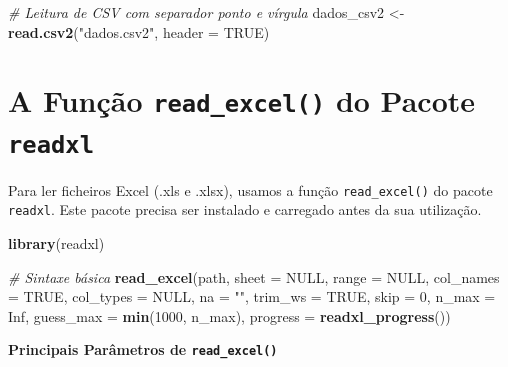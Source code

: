 \documentclass[
]{book}
\newenvironment{Shaded}{\begin{snugshade}}{\end{snugshade}}
\newcommand{\AttributeTok}[1]{\textcolor[rgb]{0.13,0.29,0.53}{#1}}
\newcommand{\CommentTok}[1]{\textcolor[rgb]{0.56,0.35,0.01}{\textit{#1}}}
\newcommand{\ConstantTok}[1]{\textcolor[rgb]{0.56,0.35,0.01}{#1}}
\newcommand{\DecValTok}[1]{\textcolor[rgb]{0.00,0.00,0.81}{#1}}
\newcommand{\FunctionTok}[1]{\textcolor[rgb]{0.13,0.29,0.53}{\textbf{#1}}}
\newcommand{\NormalTok}[1]{#1}
\newcommand{\OtherTok}[1]{\textcolor[rgb]{0.56,0.35,0.01}{#1}}
\newcommand{\StringTok}[1]{\textcolor[rgb]{0.31,0.60,0.02}{#1}}
\begin{document}
\begin{Shaded}
\begin{Highlighting}[]
\CommentTok{\# Leitura de CSV com separador ponto e vírgula}
\NormalTok{dados\_csv2 }\OtherTok{\textless{}{-}} \FunctionTok{read.csv2}\NormalTok{(}\StringTok{"dados.csv2"}\NormalTok{, }\AttributeTok{header =} \ConstantTok{TRUE}\NormalTok{)}
\end{Highlighting}
\end{Shaded}

\section{\texorpdfstring{A Função \texttt{read\_excel()} do Pacote \texttt{readxl}}{A Função read\_excel() do Pacote readxl}}\label{a-funuxe7uxe3o-read_excel-do-pacote-readxl}

Para ler ficheiros Excel (.xls e .xlsx), usamos a função \texttt{read\_excel()}
do pacote \texttt{readxl}. Este pacote precisa ser instalado e carregado antes
da sua utilização.

\begin{Shaded}
\begin{Highlighting}[]
\FunctionTok{library}\NormalTok{(readxl)}

\CommentTok{\# Sintaxe básica}
\FunctionTok{read\_excel}\NormalTok{(path, }\AttributeTok{sheet =} \ConstantTok{NULL}\NormalTok{, }\AttributeTok{range =} \ConstantTok{NULL}\NormalTok{, }\AttributeTok{col\_names =} \ConstantTok{TRUE}\NormalTok{,}
           \AttributeTok{col\_types =} \ConstantTok{NULL}\NormalTok{, }\AttributeTok{na =} \StringTok{""}\NormalTok{, }\AttributeTok{trim\_ws =} \ConstantTok{TRUE}\NormalTok{, }\AttributeTok{skip =} \DecValTok{0}\NormalTok{, }\AttributeTok{n\_max =} \ConstantTok{Inf}\NormalTok{,}
           \AttributeTok{guess\_max =} \FunctionTok{min}\NormalTok{(}\DecValTok{1000}\NormalTok{, n\_max), }\AttributeTok{progress =} \FunctionTok{readxl\_progress}\NormalTok{())}
\end{Highlighting}
\end{Shaded}

\textbf{Principais Parâmetros de \texttt{read\_excel()}}
\end{document}
